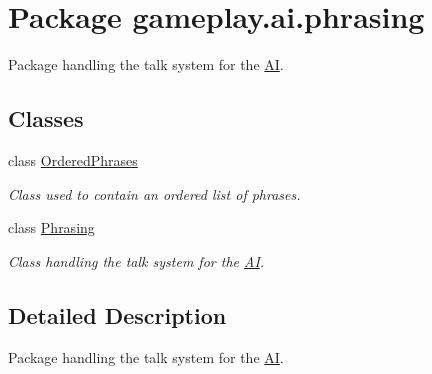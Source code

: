 \hypertarget{namespacegameplay_1_1ai_1_1phrasing}{\section{Package gameplay.\-ai.\-phrasing}
\label{namespacegameplay_1_1ai_1_1phrasing}
}


Package handling the talk system for the \hyperlink{classgameplay_1_1ai_1_1_a_i}{A\-I}.  


\subsection*{Classes}
\begin{DoxyCompactItemize}
\item 
class \hyperlink{classgameplay_1_1ai_1_1phrasing_1_1_ordered_phrases}{Ordered\-Phrases}
\begin{DoxyCompactList}\small\item\em Class used to contain an ordered list of phrases. \end{DoxyCompactList}\item 
class \hyperlink{classgameplay_1_1ai_1_1phrasing_1_1_phrasing}{Phrasing}
\begin{DoxyCompactList}\small\item\em Class handling the talk system for the \hyperlink{classgameplay_1_1ai_1_1_a_i}{A\-I}. \end{DoxyCompactList}\end{DoxyCompactItemize}


\subsection{Detailed Description}
Package handling the talk system for the \hyperlink{classgameplay_1_1ai_1_1_a_i}{A\-I}. 
